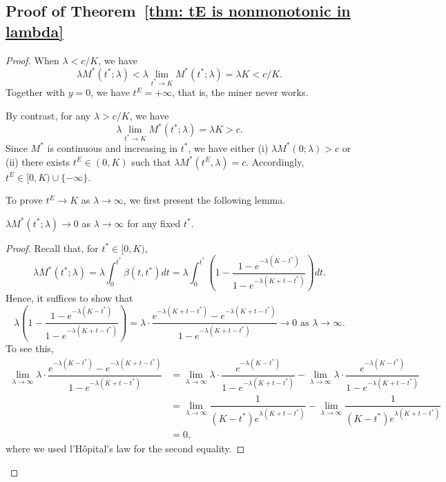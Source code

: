 \documentclass[12pt, letterpaper]{article}
\begin{document}
\subsection{Proof of Theorem~\ref{thm: tE is nonmonotonic in lambda}}
\begin{proof} %
When $\lambda < c/K$, we have
\begin{equation}
    \lambda M^*(t^*; \lambda) < \lambda \lim_{t^* \to K} M^*(t^*; \lambda) = \lambda K < c/K.
\end{equation}
Together with $y = 0$, we have $t^E = + \infty$, that is, the miner never works.

By contrast, for any $\lambda > c/K$, we have
\begin{equation}
    \lambda \lim_{t^* \to K}M^*(t^*; \lambda) = \lambda K> c.
\end{equation}
Since $M^*$ is continuous and increasing in $t^*$, we have either (i) $\lambda M^*(0; \lambda) > c$ or (ii) there exists $t^E \in (0, K)$ such that $\lambda M^*(t^E, \lambda) = c$. Accordingly, $t^E \in [0, K)\cup\{-\infty\}$.

To prove $t^E \to K$ as $\lambda \to \infty$, we first present the following lemma.

\begin{lem}\label{lem: tE nonmonotonic in lambda}
    $\lambda M^*(t^*; \lambda) \to 0$ as $\lambda \to \infty$ for any fixed $t^*$. 
\end{lem}

\begin{proof} %
Recall that, for $t^* \in [0, K)$,
\begin{equation}
    \lambda M^*(t^*; \lambda) = \lambda \int_0^{t^*} \beta(t, t^*) dt = \lambda\int_0^{t^*} \left(1 - \dfrac{1 - e^{-\lambda(K - t^*)}}{1 - e^{-\lambda(K + t - t^*)}}\right)dt.
\end{equation}
Hence, it suffices to show that
\begin{equation}
    \lambda \left(1 - \dfrac{1 - e^{-\lambda(K - t^*)}}{1 - e^{-\lambda(K + t - t^*)}}\right) = \lambda \cdot \dfrac{e^{-\lambda(K + t - t^*)} - e^{-\lambda(K + t - t^*)}}{1 - e^{-\lambda(K + t - t^*)}} \to 0 \text{ as } \lambda \to \infty.
\end{equation}
To see this,
\begin{align}
    \lim_{\lambda \to \infty}\lambda \cdot \dfrac{e^{-\lambda(K- t^*)} - e^{-\lambda(K + t - t^*)}}{1 - e^{-\lambda(K + t - t^*)}} 
    &= \lim_{\lambda \to \infty}\lambda \cdot \dfrac{e^{-\lambda(K - t^*)}}{1 - e^{-\lambda(K + t - t^*)}} - \lim_{\lambda \to \infty} \lambda \cdot \dfrac{e^{-\lambda(K - t^*)}}{1 - e^{-\lambda(K + t - t^*)}}\\
    &= \lim_{\lambda \to \infty} \dfrac{1}{(K - t^*) e^{\lambda (K + t - t^*)}} - \lim_{\lambda \to \infty} \dfrac{1}{(K - t^*) e^{\lambda (K + t - t^*)}}\\
    &= 0,
\end{align}
where we used l'H\^opital's law for the second equality.
\end{proof} %


\end{proof}
\end{document}
